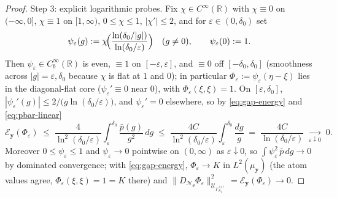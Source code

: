 \documentclass[reqno,final,11pt]{amsart}
\theoremstyle{plain}
\theoremstyle{definition}
\theoremstyle{remark}
\newcommand{\R}{\mathbb R}
\newcommand{\cE}{\mathcal E}
\newcommand{\cN}{\mathcal N}
\newcommand{\cU}{\mathcal U}
\newcommand{\GamN}{\Gamma^{(2)}_{\cN_\theta}}
\newcommand{\DN}{D_{\cN_\theta}}
\begin{document}
\begin{proof}
Step 3: explicit logarithmic probes. Fix $\chi\in C^\infty(\R)$ with
$\chi\equiv0$ on $(-\infty,0]$, $\chi\equiv1$ on $[1,\infty)$, $0\le\chi\le1$,
$|\chi'|\le2$, and for $\varepsilon\in(0,\delta_0)$ set
\[
  \psi_\varepsilon(g):=\chi\!\Bigl(\frac{\ln(\delta_0/|g|)}{\ln(\delta_0/\varepsilon)}\Bigr)
  \quad(g\neq0),\qquad \psi_\varepsilon(0):=1 .
\]
Then $\psi_\varepsilon\in C^\infty_b(\R)$ is even, $\equiv1$ on
$[-\varepsilon,\varepsilon]$, and $\equiv0$ off $[-\delta_0,\delta_0]$
(smoothness across $|g|=\varepsilon,\delta_0$ because $\chi$ is flat at $1$ and
$0$); in particular $\Phi_\varepsilon:=\psi_\varepsilon(\eta-\xi)$ lies in the
diagonal-flat core ($\psi_\varepsilon'\equiv0$ near $0$), with
$\Phi_\varepsilon(\xi,\xi)=1$. On $[\varepsilon,\delta_0]$,
$|\psi_\varepsilon'(g)|\le2/\bigl(g\ln(\delta_0/\varepsilon)\bigr)$, and
$\psi_\varepsilon'=0$ elsewhere, so by \eqref{eq:gap-energy} and
\eqref{eq:pbar-linear}
\[
  \cE_{\mathbf y}(\Phi_\varepsilon)
  \;\le\;\frac{4}{\ln^2(\delta_0/\varepsilon)}
  \int_\varepsilon^{\delta_0}\frac{\bar p(g)}{g^{2}}\,dg
  \;\le\;\frac{4C}{\ln^2(\delta_0/\varepsilon)}
  \int_\varepsilon^{\delta_0}\frac{dg}{g}
  \;=\;\frac{4C}{\ln(\delta_0/\varepsilon)}
  \;\xrightarrow[\varepsilon\downarrow0]{}\;0 .
\]
Moreover $0\le\psi_\varepsilon\le1$ and $\psi_\varepsilon\to0$ pointwise on
$(0,\infty)$ as $\varepsilon\downarrow0$, so
$\int\psi_\varepsilon^2\,\bar p\,dg\to0$ by dominated convergence; with
\eqref{eq:gap-energy}, $\Phi_\varepsilon\to K$ in $L^2(\mu_{\mathbf y})$
(the atom values agree, $\Phi_\varepsilon(\xi,\xi)=1=K$ there) and
$\|\DN\Phi_\varepsilon\|^2_{\cU_{\GamN}}=\cE_{\mathbf y}(\Phi_\varepsilon)\to0$.


\end{proof}
\end{document}
